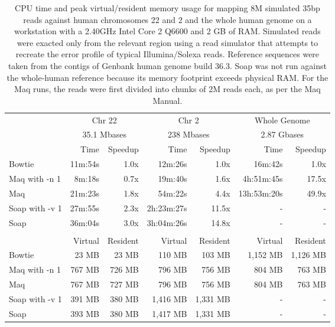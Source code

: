 \documentclass[letterpaper]{article}
\begin{document}
\begin{table}[tp]
\scriptsize
\begin{tabular}{lrrrrrr}
\toprule
 & \multicolumn{2}{c}{Chr 22} & \multicolumn{2}{c}{Chr 2} & \multicolumn{2}{c}{Whole Genome} \\[3pt] 
 & \multicolumn{2}{c}{35.1 Mbases} & \multicolumn{2}{c}{238 Mbases} & \multicolumn{2}{c}{2.87 Gbases} \\[3pt] 
 & Time & Speedup & Time & Speedup & Time & Speedup \\ 
\toprule
Bowtie & 11m:54s & 1.0x & 12m:26s & 1.0x & 16m:42s & 1.0x  \\ \midrule 
Maq with -n 1 & 8m:18s & 0.7x & 19m:40s & 1.6x & 4h:51m:45s & 17.5x  \\ \midrule 
Maq & 21m:23s & 1.8x & 54m:22s & 4.4x & 13h:53m:20s & 49.9x  \\ \midrule 
Soap with -v 1 & 27m:55s & 2.3x & 2h:23m:27s & 11.5x & - & -  \\ \midrule 
Soap & 36m:04s & 3.0x & 3h:04m:26s & 14.8x & - & -  \\[2pt] \bottomrule \\ 
 & Virtual & Resident & Virtual & Resident & Virtual & Resident \\ 
\toprule
Bowtie & 23 MB & 23 MB & 110 MB & 103 MB & 1,152 MB & 1,126 MB  \\ \midrule 
Maq with -n 1 & 767 MB & 726 MB & 796 MB & 756 MB & 804 MB & 763 MB  \\ \midrule 
Maq & 767 MB & 727 MB & 796 MB & 756 MB & 804 MB & 763 MB  \\ \midrule 
Soap with -v 1 & 391 MB & 380 MB & 1,416 MB & 1,331 MB & - & -  \\ \midrule 
Soap & 393 MB & 380 MB & 1,417 MB & 1,331 MB & - & -  \\ 
\bottomrule
\end{tabular}
\scriptsize\caption{CPU time and peak virtual/resident memory usage for mapping 8M simulated 35bp reads against human chromosomes 22 and 2 and the whole human genome on a workstation with a 2.40GHz Intel Core 2 Q6600 and 2 GB of RAM. Simulated reads were exacted only from the relevant region using a read simulator that attempts to recreate the error profile of typical Illumina/Solexa reads. Reference sequences were taken from the contigs of Genbank human genome build 36.3. Soap was not run against the whole-human reference because its memory footprint exceeds physical RAM. For the Maq runs, the reads were first divided into chunks of 2M reads each, as per the Maq Manual.}
\end{table}
\end{document}
